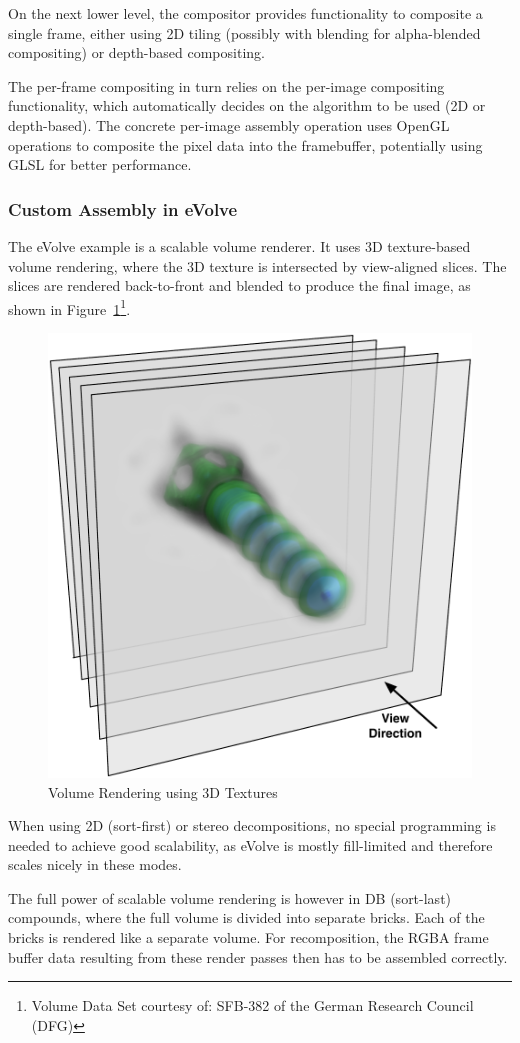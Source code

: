 \documentclass[10pt,a4]{scrartcl}
\newcommand{\fig}[1]{Figure~\ref{#1}}
\begin{document}
On the next lower level, the compositor provides functionality to
composite a single frame, either using 2D tiling (possibly with blending
for alpha-blended compositing) or depth-based compositing. 

The per-frame compositing in turn relies on the per-image compositing
functionality, which automatically decides on the algorithm to be used
(2D or depth-based). The concrete per-image assembly operation uses
OpenGL operations to composite the pixel data into the framebuffer,
potentially using GLSL for better performance.


\subsubsection{Custom Assembly in eVolve}

The \textsf{eVolve} example is a scalable volume renderer. It uses 3D
texture-based volume rendering, where the 3D texture is intersected by
view-aligned slices. The slices are rendered back-to-front and blended
to produce the final image, as shown in \fig{fSlices}\footnote{Volume
  Data Set courtesy of: SFB-382 of the German Research Council (DFG)}.

\begin{figure}
  \includegraphics[width=.382\textwidth]{images/slices.pdf}
  {\caption{\small\label{fSlices}Volume Rendering using 3D Textures}}
\end{figure}
When using 2D (sort-first) or stereo decompositions, no special
programming is needed to achieve good scalability, as \textsf{eVolve} is
mostly fill-limited and therefore scales nicely in these modes. 

The full power of scalable volume rendering is however in DB (sort-last)
compounds, where the full volume is divided into separate bricks. Each
of the bricks is rendered like a separate volume. For recomposition, the
\textsf{RGBA} frame buffer data resulting from these render passes then
has to be assembled correctly. 
\end{document}
